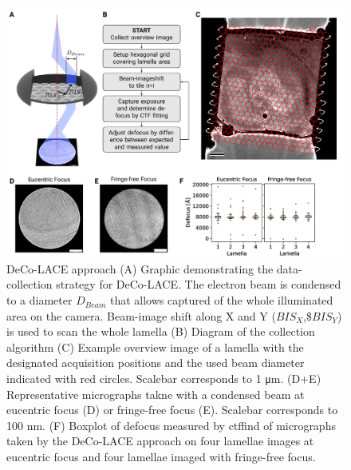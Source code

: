 \documentclass[
]{article}
\begin{document}
\begin{figure}
\hypertarget{fig:approach}{%
\centering
\includegraphics{figures/approach.png}
\caption{DeCo-LACE approach (A) Graphic demonstrating the data-collection strategy for
DeCo-LACE. The electron beam is condensed to a diameter \(D_{Beam}\) that allows captured of
the whole illuminated area on the camera. Beam-image shift along X and Y
(\(BIS_X\),\$\(BIS_Y\)) is used to scan the whole lamella
(B) Diagram of the collection algorithm
(C) Example overview image of a lamella with the designated acquisition
positions and the used beam diameter indicated with red circles. Scalebar corresponds to 1 μm.
(D+E) Representative micrographs takne with a condensed beam at eucentric focus
(D) or fringe-free focus (E). Scalebar corresponds to 100 nm.
(F) Boxplot of defocus measured by ctffind of micrographs taken by the DeCo-LACE
approach on four lamellae images at eucentric focus and four lamellae imaged with
fringe-free focus.}\label{fig:approach}
}
\end{figure}
\end{document}
